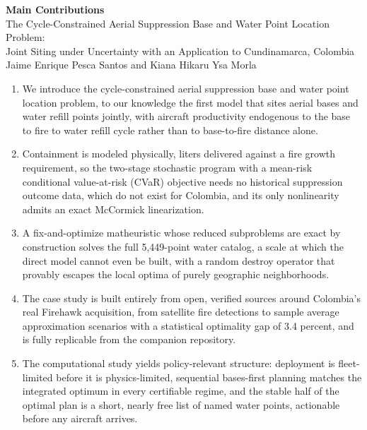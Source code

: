 \documentclass[11pt]{article}
\begin{document}
\begin{center}
{\large\bfseries Main Contributions}\\[0.6em]
The Cycle-Constrained Aerial Suppression Base and Water Point
Location Problem:\\ Joint Siting under Uncertainty with an Application
to Cundinamarca, Colombia\\[0.4em]
Jaime Enrique Pesca Santos and Kiana Hikaru Ysa Morla
\end{center}

\vspace{0.8em}

\begin{enumerate}[leftmargin=1.6em,itemsep=0.7em]

\item We introduce the cycle-constrained aerial suppression base and
water point location problem, to our knowledge the first model that
sites aerial bases and water refill points jointly, with aircraft
productivity endogenous to the base to fire to water refill cycle
rather than to base-to-fire distance alone.

\item Containment is modeled physically, liters delivered against a
fire growth requirement, so the two-stage stochastic program with a
mean-risk conditional value-at-risk (CVaR) objective needs no
historical suppression outcome data, which do not exist for Colombia,
and its only nonlinearity admits an exact McCormick linearization.

\item A fix-and-optimize matheuristic whose reduced subproblems are
exact by construction solves the full 5,449-point water catalog, a
scale at which the direct model cannot even be built, with a random
destroy operator that provably escapes the local optima of purely
geographic neighborhoods.

\item The case study is built entirely from open, verified sources
around Colombia's real Firehawk acquisition, from satellite fire
detections to sample average approximation scenarios with a
statistical optimality gap of 3.4 percent, and is fully replicable
from the companion repository.

\item The computational study yields policy-relevant structure:
deployment is fleet-limited before it is physics-limited, sequential
bases-first planning matches the integrated optimum in every
certifiable regime, and the stable half of the optimal plan is a
short, nearly free list of named water points, actionable before any
aircraft arrives.

\end{enumerate}
\end{document}
